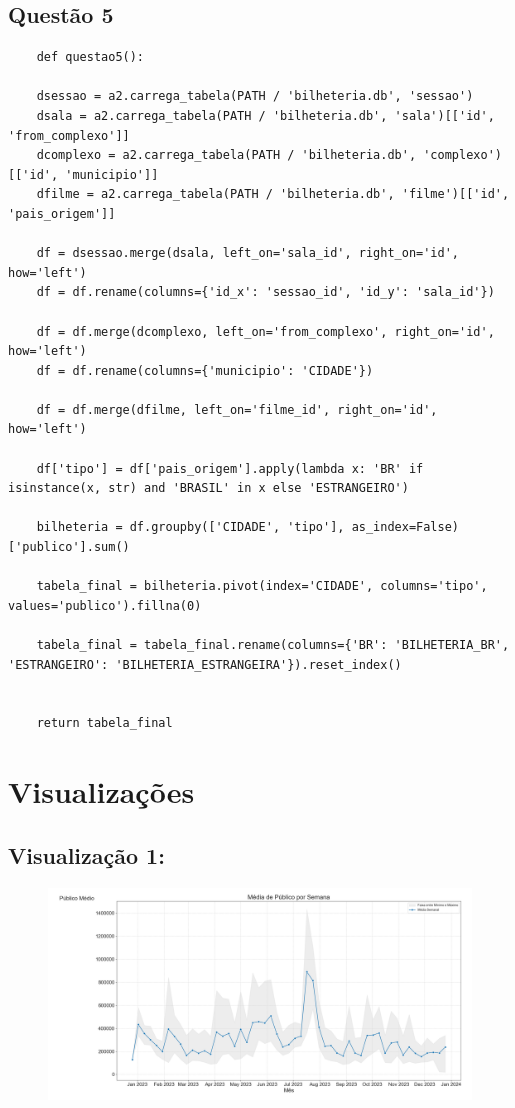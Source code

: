 \documentclass{article}
\begin{document}
\subsection*{Questão 5}
\begin{lstlisting}
    def questao5():
    
    dsessao = a2.carrega_tabela(PATH / 'bilheteria.db', 'sessao')
    dsala = a2.carrega_tabela(PATH / 'bilheteria.db', 'sala')[['id', 'from_complexo']]
    dcomplexo = a2.carrega_tabela(PATH / 'bilheteria.db', 'complexo')[['id', 'municipio']]
    dfilme = a2.carrega_tabela(PATH / 'bilheteria.db', 'filme')[['id', 'pais_origem']]

    df = dsessao.merge(dsala, left_on='sala_id', right_on='id', how='left')
    df = df.rename(columns={'id_x': 'sessao_id', 'id_y': 'sala_id'})

    df = df.merge(dcomplexo, left_on='from_complexo', right_on='id', how='left')
    df = df.rename(columns={'municipio': 'CIDADE'})

    df = df.merge(dfilme, left_on='filme_id', right_on='id', how='left')

    df['tipo'] = df['pais_origem'].apply(lambda x: 'BR' if isinstance(x, str) and 'BRASIL' in x else 'ESTRANGEIRO')

    bilheteria = df.groupby(['CIDADE', 'tipo'], as_index=False)['publico'].sum()

    tabela_final = bilheteria.pivot(index='CIDADE', columns='tipo', values='publico').fillna(0)

    tabela_final = tabela_final.rename(columns={'BR': 'BILHETERIA_BR', 'ESTRANGEIRO': 'BILHETERIA_ESTRANGEIRA'}).reset_index()
    

    return tabela_final

\end{lstlisting}
\pagebreak
\section*{Visualizações}
\subsection*{Visualização 1:}
\begin{figure}[H]
    \centerline{\includegraphics[width =\linewidth]{img/Figure_1.png}}
\end{figure}
\end{document}
